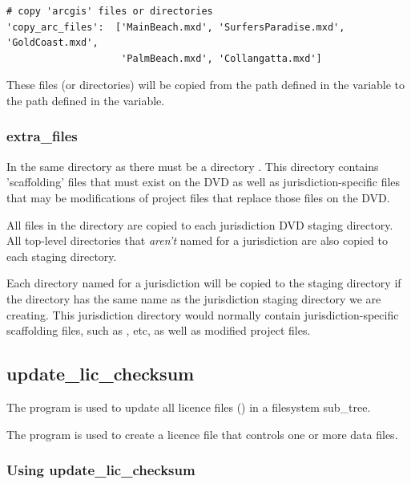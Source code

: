 \documentclass{manual}
\begin{document}
\begin{verbatim}
# copy 'arcgis' files or directories
'copy_arc_files':  ['MainBeach.mxd', 'SurfersParadise.mxd', 'GoldCoast.mxd',
                    'PalmBeach.mxd', 'Collangatta.mxd']
\end{verbatim}

These files (or directories) will be copied from the path defined in the 
variable to the path defined in the  variable.

\subsubsection{extra_files}
\label{subsubsec:update_DVD_images_extra_files}

In the same directory as  there must be a directory .
This directory contains 'scaffolding' files that must exist on the DVD as well as jurisdiction-specific
files that may be modifications of project files that replace those files on the DVD.

All files in the  directory are copied to each jurisdiction DVD staging directory.
All top-level directories that \emph{aren't} named for a jurisdiction are also copied to each
staging directory.

Each directory named for a jurisdiction will be copied to the staging directory
if the directory has the same name as the jurisdiction staging directory we are creating.
This jurisdiction directory would normally contain jurisdiction-specific scaffolding
files, such as , etc, as well as modified project files.

\pagebreak

\subsection{update_lic_checksum}
\label{subsec:update_lic_checksum}

The  program is used to update all licence files () in
a filesystem sub_tree.

The  program is used to create a licence file that controls one or more
data files.

\subsubsection{Using update_lic_checksum}
\label{subsubsec:update_lic_checksum_use}
\end{document}
